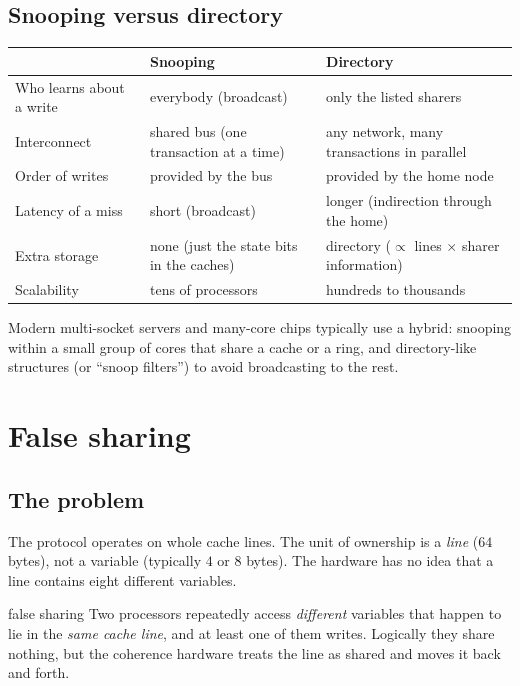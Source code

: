 \subsection{Snooping versus directory}

\begin{center}
\small
\begin{tabularx}{\linewidth}{@{}l X X@{}}
\toprule
 & \textbf{Snooping} & \textbf{Directory}\\
\midrule
Who learns about a write & everybody (broadcast) & only the listed sharers\\
Interconnect & shared bus (one transaction at a time) & any network, many transactions in parallel\\
Order of writes & provided by the bus & provided by the home node\\
Latency of a miss & short (broadcast) & longer (indirection through the home)\\
Extra storage & none (just the state bits in the caches) & directory ($\propto$ lines $\times$ sharer information)\\
Scalability & tens of processors & hundreds to thousands\\
\bottomrule
\end{tabularx}
\end{center}

Modern multi-socket servers and many-core chips typically use a hybrid: snooping within a small group of cores that
share a cache or a ring, and directory-like structures (or ``snoop filters'') to avoid broadcasting to the rest.

\section{False sharing}

\subsection{The problem}

The protocol operates on whole cache lines. The unit of ownership is a \emph{line} ($64$ bytes), not a variable (typically $4$ or $8$
bytes). The hardware has no idea that a line contains eight different variables.

\begin{definition}{false sharing}
Two processors repeatedly access \emph{different} variables that happen to lie in the \emph{same cache line}, and at least one of them writes.
Logically they share nothing, but the coherence hardware treats the line as shared and moves it back and forth.
\end{definition}

